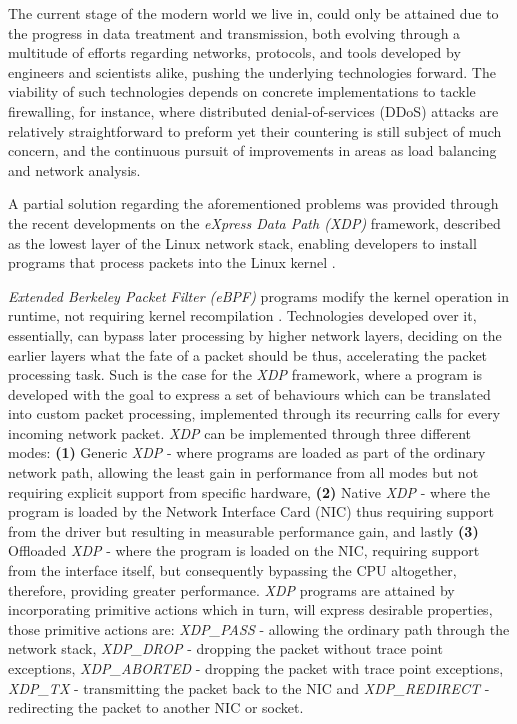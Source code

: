 The current stage of the modern world we live in, could only be attained due to the progress in data treatment and transmission, both evolving through a multitude of efforts regarding networks, protocols, and tools developed by engineers and scientists alike, pushing the underlying technologies forward.
The viability of such technologies depends on concrete implementations to tackle firewalling, for instance, where distributed denial-of-services (DDoS) attacks are relatively straightforward to preform yet their countering is still subject of much concern, and the continuous pursuit of improvements in areas as load balancing and network analysis.

A partial solution regarding the aforementioned problems was provided through the recent developments on the \textit{eXpress Data Path (XDP)} framework, described as the lowest layer of the Linux network stack, enabling developers to install programs that process packets into the Linux kernel \cite{FastXDP}.

\textit{Extended Berkeley Packet Filter (eBPF)} programs modify the kernel operation in runtime, not requiring kernel recompilation \cite{FastXDP}.
Technologies developed over it, essentially, can bypass later processing by higher network layers, deciding on the earlier layers what the fate of a packet should be thus, accelerating the packet processing task.
Such is the case for the \textit{XDP} framework, where a program is developed with the goal to express a set of behaviours which can be translated into custom packet processing, implemented through its recurring calls for every incoming network packet.
\textit{XDP} can be implemented through three different modes: \textbf{(1)} Generic \textit{XDP} - where programs are loaded as part of the ordinary network path, allowing the least gain in performance from all modes but not requiring explicit support from specific hardware, \textbf{(2)} Native \textit{XDP} - where the program is loaded by the Network Interface Card (NIC) thus requiring support from the driver but resulting in measurable performance gain, and lastly \textbf{(3)} Offloaded \textit{XDP} - where the program is loaded on the NIC, requiring support from the interface itself, but consequently bypassing the CPU altogether, therefore, providing greater performance.
\textit{XDP} programs are attained by incorporating primitive actions which in turn, will express desirable properties, those primitive actions are: \textit{XDP\_PASS} - allowing the ordinary path through the network stack, \textit{XDP\_DROP} - dropping the packet without trace point exceptions, \textit{XDP\_ABORTED} - dropping the packet with trace point exceptions, \textit{XDP\_TX} - transmitting the packet back to the NIC and \textit{XDP\_REDIRECT} - redirecting the packet to another NIC or socket.

